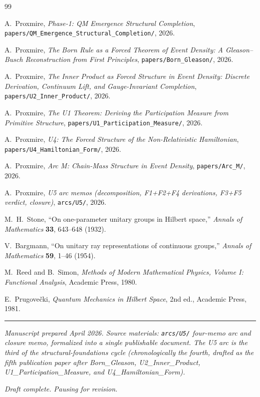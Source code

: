 \documentclass[11pt,a4paper]{article}
\begin{document}
\begin{thebibliography}{99}

A.~Proxmire, \emph{Phase-1: QM Emergence Structural Completion}, \texttt{papers/QM\_Emergence\_Structural\_Completion/}, 2026.

A.~Proxmire, \emph{The Born Rule as a Forced Theorem of Event Density: A Gleason--Busch Reconstruction from First Principles}, \texttt{papers/Born\_Gleason/}, 2026.

A.~Proxmire, \emph{The Inner Product as Forced Structure in Event Density: Discrete Derivation, Continuum Lift, and Gauge-Invariant Completion}, \texttt{papers/U2\_Inner\_Product/}, 2026.

A.~Proxmire, \emph{The U1 Theorem: Deriving the Participation Measure from Primitive Structure}, \texttt{papers/U1\_Participation\_Measure/}, 2026.

A.~Proxmire, \emph{U4: The Forced Structure of the Non-Relativistic Hamiltonian}, \texttt{papers/U4\_Hamiltonian\_Form/}, 2026.

A.~Proxmire, \emph{Arc M: Chain-Mass Structure in Event Density}, \texttt{papers/Arc\_M/}, 2026.

A.~Proxmire, \emph{U5 arc memos (decomposition, F1+F2+F4 derivations, F3+F5 verdict, closure)}, \texttt{arcs/U5/}, 2026.

M.~H.~Stone, ``On one-parameter unitary groups in Hilbert space,'' \emph{Annals of Mathematics} \textbf{33}, 643--648 (1932).

V.~Bargmann, ``On unitary ray representations of continuous groups,'' \emph{Annals of Mathematics} \textbf{59}, 1--46 (1954).

M.~Reed and B.~Simon, \emph{Methods of Modern Mathematical Physics, Volume I: Functional Analysis}, Academic Press, 1980.

E.~Prugove\v{c}ki, \emph{Quantum Mechanics in Hilbert Space}, 2nd ed., Academic Press, 1981.

\end{thebibliography}

\vspace{1em}
\noindent\rule{\linewidth}{0.4pt}
\vspace{0.2em}

\noindent\emph{Manuscript prepared April 2026. Source materials: \texttt{arcs/U5/} four-memo arc and closure memo, formalized into a single publishable document. The U5 arc is the third of the structural-foundations cycle (chronologically the fourth, drafted as the fifth publication paper after Born\_Gleason, U2\_Inner\_Product, U1\_Participation\_Measure, and U4\_Hamiltonian\_Form).}

\noindent\emph{Draft complete. Pausing for revision.}
\end{document}
